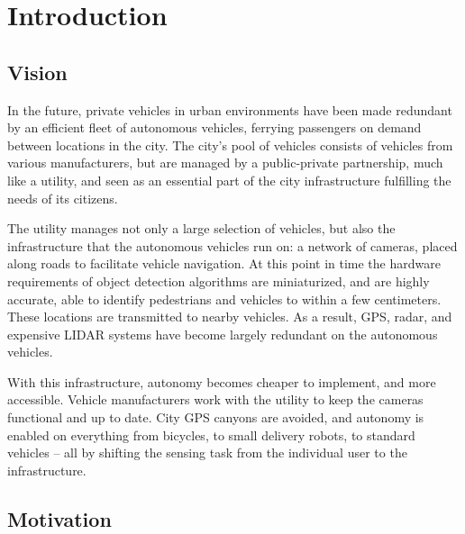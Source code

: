 \documentclass[a4paper,12pt,twoside,openright]{report}
\begin{document}
\pagestyle{empty}
\singlespacing

\onehalfspacing

\singlespacing


\setcounter{page}{0}
\pagestyle{plain}
\tableofcontents
\listoffigures
\listoftables

\onehalfspacing


\chapter{Introduction}
\setcounter{page}{1} 

\section{Vision}

In the future, private vehicles in urban environments have been made redundant by an efficient
fleet of autonomous vehicles, ferrying passengers on demand between locations in 
the city. The city's pool of vehicles consists of vehicles from various manufacturers, 
but are managed by a public-private partnership, much like a utility, and 
seen as an essential part of the city infrastructure fulfilling the needs of its citizens.

The utility manages not only a large selection of vehicles, but also the infrastructure 
that the autonomous vehicles run on: a network of cameras, placed along roads to 
facilitate vehicle navigation. At this point in time the hardware requirements of
object detection algorithms are miniaturized, and are highly accurate, able to identify
pedestrians and vehicles to within a few centimeters. These locations are
transmitted to nearby vehicles. As a result, GPS, radar, and expensive LIDAR systems
have become largely redundant on the autonomous vehicles.

With this infrastructure, autonomy becomes cheaper to implement,
and more accessible. Vehicle manufacturers work with the utility to keep the cameras 
functional and up to date. City GPS canyons are avoided, and autonomy is enabled 
on everything from bicycles, to small delivery robots, to standard vehicles -- all by 
shifting the sensing task from the individual user to the infrastructure.

\section{Motivation}
\end{document}
